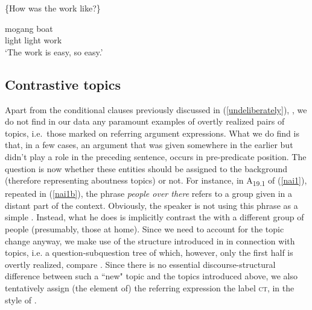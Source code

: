 \documentclass[output=paper
,modfonts
,nonflat]{langsci/langscibook}
\begin{document}
\begin{exe}
	\ex\label{easyWork}
	\begin{xlist}
		 \{How was the work like?\}
	\end{xlist}
	\begin{xlist}[> A\textsubscript{{2.1''''+}}:]
		\exi{}{[\dots]}
		\exi{> A\textsubscript{{2.1''''+}}:}
		 {mogang{\cb}\focus} {{\ob}boat{\cb}\topic{\cb}\sq}\\
		\hphantom{[[}light light work\\
		\glt `The work is easy, so easy.'
	\end{xlist}
\end{exe}

\subsection{Contrastive topics}

Apart from the conditional clauses previously discussed in (\ref{undeliberately}), , we do not find in our data any paramount examples of overtly realized pairs of  topics, i.e.\ those marked on referring argument expressions. What we do find is that, in a few cases, an argument that was given somewhere in the earlier  but didn't play a role in the preceding sentence, occurs in pre-predicate position. The question is now whether these entities should be assigned to the background (therefore representing aboutness topics) or not. For instance, in A\textsubscript{{19.1}} of (\ref{nai1}), repeated in (\ref{nai1b}), the phrase \textit{people over there} refers to a group given in a distant part of the  context. Obviously, the speaker is not using this phrase as a simple . Instead, what he does is implicitly contrast the  with a different group of people (presumably, those at home). Since we need to account for the topic change anyway, we make use of the structure introduced in  in connection with  topics, i.e. a question-subquestion tree of which, however, only the first half is overtly realized, compare \cite[Sect.\ 5.2]{riear17b}. Since there is no essential discourse-structural difference between such a ``new" topic and the  topics introduced above, we also tentatively assign (the  element of) the referring expression the label \textsc{ct}, in the style of \cite[526]{bueda03}. 
\end{document}
